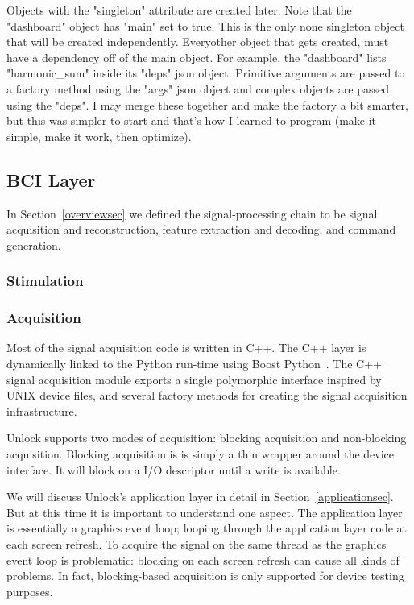 \documentclass[11pt]{article}
\begin{document}
Objects with the "singleton" attribute are created later.   Note that the "dashboard" object has "main" set to true.  This is the only none singleton object that will be created independently.  Everyother object that gets created, must have a dependency off of the main object.  For example, the "dashboard" lists "harmonic\_sum" inside its "deps" json object.  Primitive arguments are passed to a factory method using the "args" json object and complex objects are passed using the "deps".  I may merge these together and make the factory a bit smarter, but this was simpler to start and that's how I learned to program (make it simple, make it work, then optimize).

\subsection{BCI Layer}\label{bcisec}

In Section~\ref{overviewsec} we defined the signal-processing chain to be signal acquisition and reconstruction, feature extraction and decoding, and command generation.

\subsubsection{Stimulation}

\subsubsection{Acquisition}\label{acquisitionsec}

Most of the signal acquisition code is written in C++.  The C++ layer is dynamically linked to the Python run-time using Boost Python~\cite{boostpython}.  The C++ signal acquisition module exports a single polymorphic interface inspired by UNIX device files, and several factory methods for creating the signal acquisition infrastructure.

Unlock supports two modes of acquisition: blocking acquisition and non-blocking acquisition.  Blocking acquisition is is simply a thin wrapper around the device interface.  It will block on a I/O descriptor until a write is available.

We will discuss Unlock's application layer in detail in Section~\ref{applicationsec}.  But at this time it is important to understand one aspect.  The application layer is essentially a graphics event loop; looping through the application layer code at each screen refresh.  To acquire the signal on the same thread as the graphics event loop is problematic: blocking on each screen refresh can cause all kinds of problems.  In fact, blocking-based acquisition is only supported for device testing purposes. 
\end{document}
